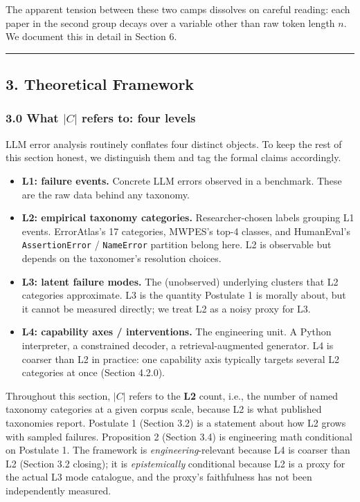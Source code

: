 \documentclass[
]{article}
\providecommand{\tightlist}{%
  \setlength{\itemsep}{0pt}\setlength{\parskip}{0pt}}
\begin{document}
The apparent tension between these two camps dissolves on careful
reading: each paper in the second group decays over a variable other
than raw token length \(n\). We document this in detail in Section 6.

\begin{center}\rule{0.5\linewidth}{0.5pt}\end{center}

\subsection{3. Theoretical Framework}\label{theoretical-framework}

\subsubsection{\texorpdfstring{3.0 What \(|C|\) refers to: four
levels}{3.0 What \textbar C\textbar{} refers to: four levels}}\label{what-c-refers-to-four-levels}

LLM error analysis routinely conflates four distinct objects. To keep
the rest of this section honest, we distinguish them and tag the formal
claims accordingly.

\begin{itemize}
\tightlist
\item
  \textbf{L1: failure events.} Concrete LLM errors observed in a
  benchmark. These are the raw data behind any taxonomy.
\item
  \textbf{L2: empirical taxonomy categories.} Researcher-chosen labels
  grouping L1 events. ErrorAtlas's 17 categories, MWPES's top-4 classes,
  and HumanEval's \texttt{AssertionError} / \texttt{NameError} partition
  belong here. L2 is observable but depends on the taxonomer's
  resolution choices.
\item
  \textbf{L3: latent failure modes.} The (unobserved) underlying
  clusters that L2 categories approximate. L3 is the quantity Postulate
  1 is morally about, but it cannot be measured directly; we treat L2 as
  a noisy proxy for L3.
\item
  \textbf{L4: capability axes / interventions.} The engineering unit. A
  Python interpreter, a constrained decoder, a retrieval-augmented
  generator. L4 is coarser than L2 in practice: one capability axis
  typically targets several L2 categories at once (Section 4.2.0).
\end{itemize}

Throughout this section, \(|C|\) refers to the \textbf{L2} count, i.e.,
the number of named taxonomy categories at a given corpus scale, because
L2 is what published taxonomies report. Postulate 1 (Section 3.2) is a
statement about how L2 grows with sampled failures. Proposition 2
(Section 3.4) is engineering math conditional on Postulate 1. The
framework is \emph{engineering}-relevant because L4 is coarser than L2
(Section 3.2 closing); it is \emph{epistemically} conditional because L2
is a proxy for the actual L3 mode catalogue, and the proxy's
faithfulness has not been independently measured.
\end{document}
